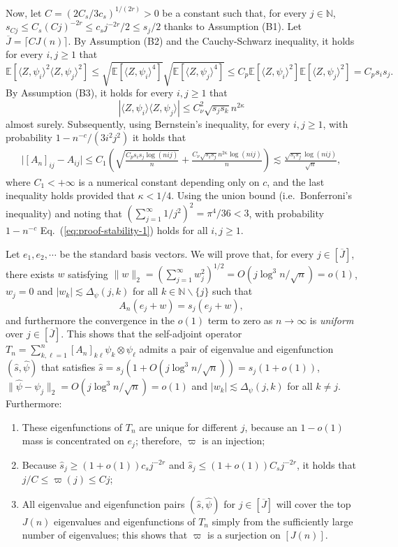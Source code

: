 \documentclass[11pt,a4paper]{article}
\renewcommand{\hat}{\widehat}
\renewcommand{\bar}{\overline}
\theoremstyle{definition}
\theoremstyle{plain}
\theoremstyle{remark}
\begin{document}
Now, let $C=(2C_s/3c_s)^{1/(2r)}>0$ be a constant such that, for every $j\in\mathbb N$, $s_{Cj}\leq C_s (Cj)^{-2r} \leq c_sj^{-2r}/2\leq s_j/2$ thanks to Assumption (B1). 
Let $\bar J=\lceil CJ(n)\rceil$.
By Assumption (B2) and the Cauchy-Schwarz inequality, it holds for every $i,j\geq 1$ that 
$$
\mathbb E[\langle Z,\psi_i\rangle^2\langle Z,\psi_j\rangle^2] \leq \sqrt{\mathbb E[\langle Z,\psi_i\rangle^4]}\sqrt{\mathbb E[\langle Z,\psi_j\rangle^4]}
\leq C_p\mathbb E[\langle Z,\psi_i\rangle^2]\mathbb E[\langle Z,\psi_j\rangle^2] = C_ps_is_j.
$$
By Assumption (B3), it holds for every $i,j\geq 1$ that 
$$
|\langle Z,\psi_i\rangle\langle Z,\psi_j\rangle| \leq C_\nu^2\sqrt{s_js_k}n^{2\kappa}
$$ almost surely.
Subsequently, using Bernstein's inequality, for every $i,j\geq 1$, with probability $1-n^{-c}/(3i^2j^2)$ it holds that 
\begin{align}
\big|[A_n]_{ij}-A_{ij}\big| \leq C_1\left(\sqrt{\frac{C_ps_is_j\log (nij)}{n}} + \frac{C_\nu\sqrt{s_is_j}n^{2\kappa}\log (nij)}{n}\right) \lesssim \frac{\sqrt{s_is_j}\log(nij)}{\sqrt{n}},
\label{eq:proof-stability-1}
\end{align}
where $C_1<+\infty$ is a numerical constant depending only on $c$, and the last inequality holds provided that $\kappa<1/4$.
Using the union bound (i.e.~Bonferroni's inequality) and noting that $(\sum_{j=1}^{\infty}1/j^2)^2=\pi^4/36<3$, with probability $1-n^{-c}$ Eq.~(\ref{eq:proof-stability-1}) holds for all $i,j\geq 1$.

Let $e_1,e_2,\cdots$ be the standard basis vectors.
We will prove that, for every $j\in[\bar J]$, there exists $w$ satisfying $\|w\|_2 =(\sum_{j=1}^{\infty}w_j^2)^{1/2}= O(j\log^3 n/\sqrt{n})=o(1)$, $w_j=0$ and $|w_k|\lesssim \Delta_\psi(j,k)$ for all $k\in\mathbb N\backslash\{j\}$ such that
\begin{equation}
A_n (e_j+w) = s_j(e_j+w),
\label{eq:eigen-an}
\end{equation}
and furthermore the convergence in the $o(1)$ term to zero as $n\to\infty$ is \emph{uniform} over $j\in[\bar J]$.
This shows that the self-adjoint operator $T_n=\sum_{k,\ell=1}^{n}[A_n]_{k\ell}\psi_k\otimes\psi_\ell$ admits a pair of eigenvalue and eigenfunction $(\hat s,\hat\psi)$ that satisfies
$\hat s=s_j(1+O(j\log^3 n/\sqrt{n}))=s_j(1+o(1))$, $\|\hat\psi-\psi_j\|_2=O(j\log^3 n/\sqrt{n})=o(1)$ and $|w_k|\lesssim \Delta_\psi(j,k)$ for all $k\neq j$. 
Furthermore:
\begin{enumerate}
\item These eigenfunctions of $T_n$ are unique for different $j$, because an $1-o(1)$ mass is concentrated on $e_j$; therefore, $\varpi$ is an injection;
\item Because $\hat s_j \geq (1+o(1))c_s j^{-2r}$ and $\hat s_j\leq (1+o(1))C_s j^{-2r}$, it holds that $j/C\leq \varpi(j)\leq Cj$;
\item All eigenvalue and eigenfunction pairs $(\hat s,\hat\psi)$ for $j\in[\bar J]$ will cover the top $J(n)$ eigenvalues and eigenfunctions of $T_n$ simply from the sufficiently large number of eigenvalues;
this shows that $\varpi$ is a surjection on $[J(n)]$.
\end{enumerate}
\end{document}
